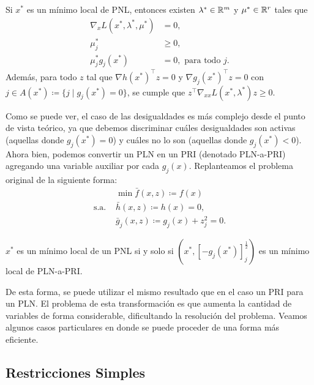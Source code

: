 \begin{proposition}
	\label{prop:PNL_multipliers}
	Si \(x^{\ast}\) es un mínimo local de PNL, entonces existen \(\lambda^{\ast} \in \mathbb{R}^m\) y \(\mu^{\ast} \in \mathbb{R}^r\) tales que
	\begin{align*}
		\nabla_{x} L(x^{\ast}, \lambda^{\ast}, \mu^{\ast})	&= 0,\\
		\mu_{j}^{\ast}										&\geq 0,\\
		\mu_{j}^{\ast} g_{j}(x^{\ast})						&=0, \text{ para todo } j.
	\end{align*}
	Además, para todo \(z\) tal que \(\nabla h(x^{\ast})^{\top} z = 0\) y \(\nabla g_{j}(x^{\ast})^{\top} z = 0\) con \(j \in A(x^{\ast}) \coloneqq \{j \mid g_{j}(x^{\ast}) = 0\}\), se cumple que \(z^{\top} \nabla_{xx} L(x^{\ast}, \lambda^{\ast}) z \geq 0\).
\end{proposition}

Como se puede ver, el caso de las desigualdades es más complejo desde el punto de vista teórico, ya que debemos discriminar cuáles desigualdades son activas (aquellas donde \(g_{j}(x^{\ast}) = 0\)) y cuáles no lo son (aquellas donde \(g_{j}(x^{\ast}) < 0\)). Ahora bien, podemos convertir un PLN en un PRI (denotado PLN-a-PRI) agregando una variable auxiliar por cada \(g_{j}(x)\). Replanteamos el problema original de la siguiente forma:
\begin{align*}
					& \min \bar{f}(x,z) \coloneqq f(x) \\
	\text{s.a. }	& \bar{h}(x,z) \coloneqq h(x) = 0, \\
					& \bar{g}_{j}(x, z) \coloneqq g_{j}(x) + z_{j}^{2} = 0.
\end{align*}

\begin{proposition}
	\(x^{\ast}\) es un mínimo local de un PNL si y solo si \((x^{\ast}, [-g_{j}(x^{\ast})]_{j}^{\frac{1}{2}})\) es un mínimo local de PLN-a-PRI.
\end{proposition}

De esta forma, se puede utilizar el mismo resultado que en el caso un PRI para un PLN. El problema de esta transformación es que aumenta la cantidad de variables de forma considerable, dificultando la resolución del problema. Veamos algunos casos particulares en donde se puede proceder de una forma más eficiente.

\subsection{Restricciones Simples}

